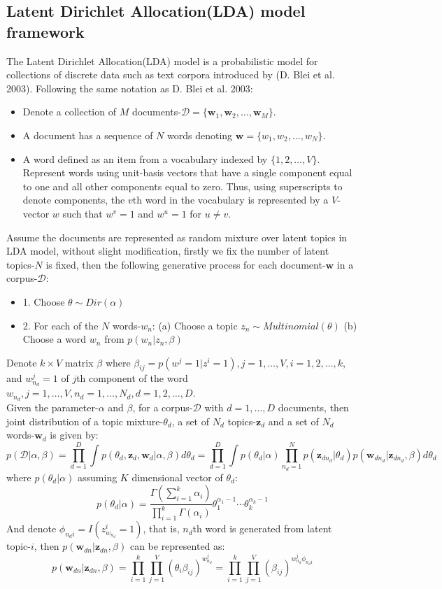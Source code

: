 \documentclass{article}
\newcommand{\bi}{\begin{itemize}}
\newcommand{\ei}{\end{itemize}}
\newcommand{\bs}{\boldsymbol}
\newcommand{\Prod}{\displaystyle\prod}
\begin{document}
\subsection{Latent Dirichlet Allocation(LDA) model framework}
The Latent Dirichlet Allocation(LDA) model is a probabilistic model for collections of discrete data such as text corpora introduced by (D. Blei et al. 2003). Following the same notation as D. Blei et al. 2003:\\
\bi
\item Denote a collection of $M$ documents-$\mathcal{D}=\{\bs{w}_1,\bs{w}_2,\ldots,\bs{w}_M\}$.
\item A document has a sequence of $N$ words denoting $\bs{w}=\{w_1,w_2,\ldots,w_N\}$.
\item A word defined as an item from a vocabulary indexed by $\{1,2,\ldots,V\}$. Represent words using unit-basis vectors that have a single component equal to
one and all other components equal to zero. Thus, using superscripts to denote components, the $v$th word in the vocabulary is represented by a $V$-vector $w$ such that $w^v = 1$ and $w^u=1$ for
$u\neq v$.
\ei
Assume the documents are represented as random mixture over latent topics in LDA model, without slight modification, firstly we fix the number of latent topics-$N$ is fixed, then the following generative process for each document-$\bs{w}$ in a corpus-$\mathcal{D}$:\\
\bi
\item[1.] Choose $\theta\sim Dir(\alpha)$
\item[2.] For each of the $N$ words-$w_n$:
\subitem(a) Choose a topic $z_n\sim Multinomial(\theta)$
\subitem(b) Choose a word $w_n$ from $p(w_n|z_n,\beta)$
\ei
Denote $k\times V$ matrix $\beta$ where $\beta_{ij}=p(w^j=1|z^i=1),j=1,\ldots,V,i=1,2,\ldots,k$, and $w_{n_d}^j=1$ of $j$th component of the word $w_{n_d},j=1,\ldots,V,n_d=1,\ldots,N_d,d=1,2,\ldots,D$.
\\
Given the parameter-$\alpha$ and $\beta$, for a corpus-$\mathcal{D}$ with  $d=1,\ldots,D$ documents,
then joint distribution of a topic mixture-$\theta_d$, a set of $N_d$ topics-$\bs{z}_d$ and a set of $N_d$ words-$\bs{w}_d$ is given by:
\[
p(\mathcal{D}|\alpha,\beta)=\Prod_{d=1}^{D}\int p(\theta_d,\bs{z}_d,\bs{w}_d|\alpha,\beta)d\theta_d=\Prod_{d=1}^{D}\int p(\theta_d|\alpha)\Prod_{n_d=1}^{N}p(\bs{z}_{dn_d}|\theta_d)p(\bs{w}_{dn_d}|\bs{z}_{dn_d},\beta)d\theta_d
\]
where $p(\theta_d|\alpha)$ assuming $K$ dimensional vector of $\theta_d$:\\
\[
p(\theta_d|\alpha)=\frac{\Gamma(\sum_{i=1}^{k}\alpha_i)}{\prod_{i=1}^{k}\Gamma(\alpha_i)}\theta_1^{\alpha_1-1}\cdots\theta_k^{\alpha_k-1}
\]
And denote $\phi_{n_di}=I(z_{w_{n_d}}^i=1)$, that is, $n_d$th word is generated from latent topic-$i$, then $p(\bs{w}_{dn}|\bs{z}_{dn},\beta)$ can be represented as:\\
\[
p(\bs{w}_{dn}|\bs{z}_{dn},\beta)=\Prod_{i=1}^{k}\Prod_{j=1}^{V}(\theta_{i}\beta_{ij})^{w_{n_d}^{j}}=\Prod_{i=1}^{k}\Prod_{j=1}^{V}(\beta_{ij})^{w_{n_d}^{j}\phi_{n_di}}
\]
\end{document}
